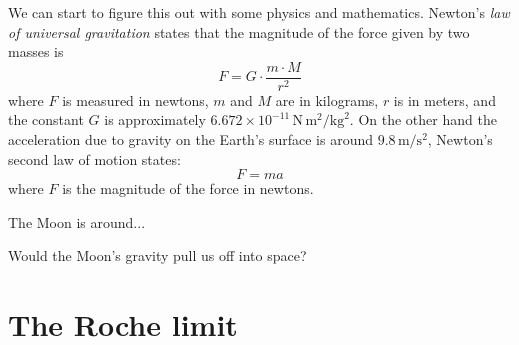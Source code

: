 \documentclass{ximera}
\begin{document}
We can start to figure this out with some physics and mathematics.
Newton's \textit{law of universal gravitation} states that the
magnitude of the force given by two masses is
\[
F = G \cdot \frac{m\cdot M}{r^2} 
\]
where $F$ is measured in newtons, $m$ and $M$ are in kilograms, $r$ is
in meters, and the constant $G$ is approximately $6.672\times
10^{-11}\, \mathrm{N}\, \mathrm{m}^2/\mathrm{kg}^2$. On the other hand
the acceleration due to gravity on the Earth's surface is around
$9.8\, \mathrm{m}/\mathrm{s}^2$, Newton's second law of motion states:
\[
F = ma
\]
where $F$ is the magnitude of the force in newtons.


The Moon is around...






\begin{question}
Would the Moon's gravity pull us off into space? 
\end{question}

\section{The Roche limit} %
\end{document}
